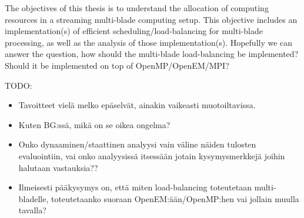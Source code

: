 The objectives of this thesis is to understand the allocation of computing resources in a streaming multi-blade computing setup. This objective includes an implementation(s) of efficient scheduling/load-balancing for multi-blade processing, as well as the analysis of those implementation(s). Hopefully we can answer the question, how should the multi-blade load-balancing be implemented? Should it be implemented on top of OpenMP/OpenEM/MPI?







TODO:
\begin{itemize}
\item Tavoitteet vielä melko epäselvät, ainakin vaikeasti muotoiltavissa.
\item Kuten BG:ssä, mikä on se oikea ongelma?
\item Onko dynaaminen/staattinen analyysi vain väline näiden tulosten evaluointiin, vai onko analyysissä itsessään jotain kysymysmerkkejä joihin halutaan vastauksia??
\item Ilmeisesti pääkysymys on, että miten load-balancing toteutetaan multi-bladelle, toteutetaanko suoraan OpenEM:ään/OpenMP:hen vai jollain muulla tavalla?
\end{itemize}


